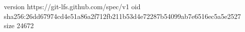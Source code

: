 version https://git-lfs.github.com/spec/v1
oid sha256:26dd67974cd4e51a86a2f712fb211b53d4e72287b54099ab7e6516ec5a5e2527
size 24672
